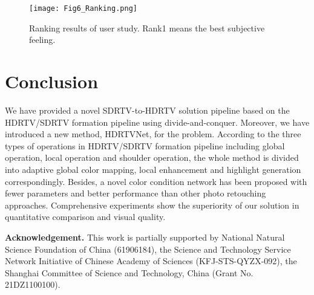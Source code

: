 \documentclass[10pt,twocolumn,letterpaper]{article}
\begin{document}
\begin{figure}[!h]
    \centering
    \texttt{[image: Fig6\_Ranking.png]}
    \caption{Ranking results of user study. Rank1 means the best subjective feeling.}
    \label{Figure 6 Ranking}
\end{figure}
\vspace{-10pt}

\section{Conclusion}
We have provided a novel SDRTV-to-HDRTV solution pipeline based on the HDRTV/SDRTV formation pipeline using divide-and-conquer. Moreover, we have introduced a new method, HDRTVNet, for the problem. According to the three types of operations in HDRTV/SDRTV formation pipeline including global operation, local operation and shoulder operation, the whole method is divided into adaptive global color mapping, local enhancement and highlight generation correspondingly. Besides, a novel color condition network has been proposed with fewer parameters and better performance than other photo retouching approaches. Comprehensive experiments show the superiority of our solution in quantitative comparison and visual quality. 

\noindent\textbf{Acknowledgement.} This work is partially supported by National Natural Science Foundation of China (61906184), the Science and Technology Service Network Initiative of Chinese Academy of Sciences (KFJ-STS-QYZX-092), the Shanghai Committee of Science and Technology, China (Grant No. 21DZ1100100).

{\small


}

\clearpage










\end{document}
